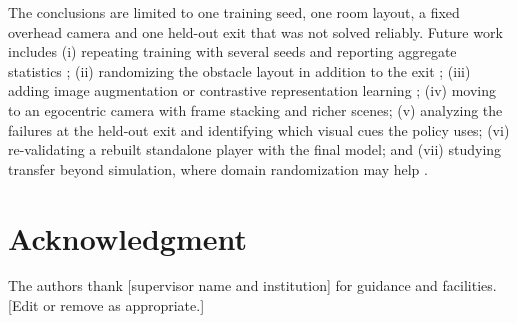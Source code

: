 \documentclass[conference]{IEEEtran}
\begin{document}
The conclusions are limited to one training seed, one room layout, a fixed overhead camera and one held-out exit that was not solved reliably. Future work includes (i) repeating training with several seeds and reporting aggregate statistics \cite{agarwal2021precipice}; (ii) randomizing the obstacle layout in addition to the exit \cite{cobbe2020procgen}; (iii) adding image augmentation \cite{kostrikov2021drq} or contrastive representation learning \cite{laskin2020curl}; (iv) moving to an egocentric camera with frame stacking and richer scenes; (v) analyzing the failures at the held-out exit and identifying which visual cues the policy uses; (vi) re-validating a rebuilt standalone player with the final model; and (vii) studying transfer beyond simulation, where domain randomization may help \cite{tobin2017domain}.


\section*{Acknowledgment}
The authors thank [supervisor name and institution] for guidance and facilities. [Edit or remove as appropriate.]
\end{document}
